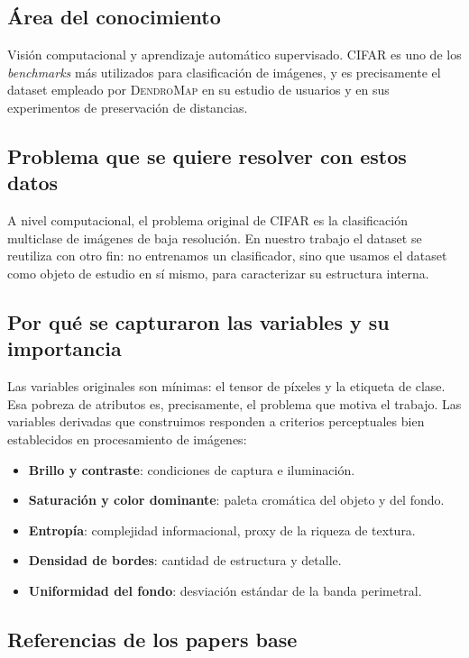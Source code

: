 \documentclass[11pt,a4paper]{article}
\begin{document}
\subsection{Área del conocimiento}

Visión computacional y aprendizaje automático supervisado. CIFAR es uno de los
\emph{benchmarks} más utilizados para clasificación de imágenes, y es
precisamente el dataset empleado por \textsc{DendroMap} en su estudio de usuarios
y en sus experimentos de preservación de distancias.

\subsection{Problema que se quiere resolver con estos datos}

A nivel computacional, el problema original de CIFAR es la clasificación
multiclase de imágenes de baja resolución. En nuestro trabajo el dataset se
reutiliza con otro fin: no entrenamos un clasificador, sino que usamos el dataset
como objeto de estudio en sí mismo, para caracterizar su estructura interna.

\subsection{Por qué se capturaron las variables y su importancia}

Las variables originales son mínimas: el tensor de píxeles y la etiqueta de
clase. Esa pobreza de atributos es, precisamente, el problema que motiva el
trabajo. Las variables derivadas que construimos responden a criterios
perceptuales bien establecidos en procesamiento de imágenes:

\begin{itemize}[leftmargin=*]
  \item \textbf{Brillo y contraste}: condiciones de captura e iluminación.
  \item \textbf{Saturación y color dominante}: paleta cromática del objeto y del fondo.
  \item \textbf{Entropía}: complejidad informacional, proxy de la riqueza de textura.
  \item \textbf{Densidad de bordes}: cantidad de estructura y detalle.
  \item \textbf{Uniformidad del fondo}: desviación estándar de la banda perimetral.
\end{itemize}

\subsection{Referencias de los papers base}
\end{document}
